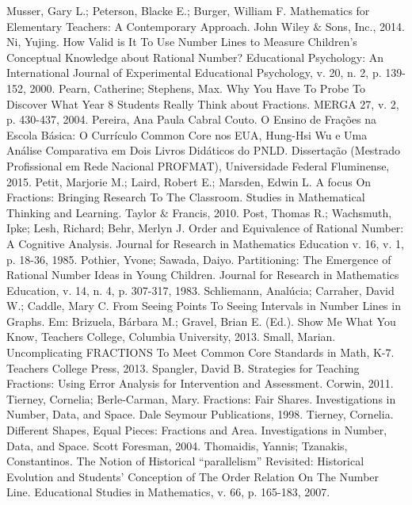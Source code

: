 \begin{thebibliography}{9}
     Musser, Gary L.; Peterson, Blacke E.; Burger, William F. Mathematics for Elementary Teachers: A Contemporary Approach. John Wiley $\&$ Sons, Inc., 2014.
     Ni, Yujing. How Valid is It To Use Number Lines to Measure Children's Conceptual Knowledge about Rational Number? Educational Psychology: An International Journal of Experimental Educational Psychology, v. 20, n. 2, p. 139-152, 2000.
     Pearn, Catherine; Stephens, Max. Why You Have To Probe To Discover What Year 8 Students Really Think about Fractions. MERGA 27, v. 2, p. 430-437, 2004.
     Pereira, Ana Paula Cabral Couto. O Ensino de Frações na Escola Básica: O Currículo Common Core nos EUA, Hung-Hsi Wu e Uma Análise Comparativa em Dois Livros Didáticos do PNLD. Dissertação (Mestrado Profissional em Rede Nacional PROFMAT), Universidade Federal Fluminense, 2015.
     Petit, Marjorie M.; Laird, Robert E.; Marsden, Edwin L. A focus On Fractions: Bringing Research To The Classroom. Studies in Mathematical Thinking and Learning. Taylor $\&$ Francis, 2010.
    Post, Thomas R.; Wachsmuth, Ipke; Lesh, Richard; Behr, Merlyn J. Order and Equivalence of Rational Number: A Cognitive Analysis. Journal for Research in Mathematics Education v. 16, v. 1, p. 18-36, 1985.
    Pothier, Yvone; Sawada, Daiyo. Partitioning: The Emergence of Rational Number Ideas in Young Children. Journal for Research in Mathematics Education, v. 14, n. 4, p. 307-317, 1983.
     Schliemann, Analúcia; Carraher, David W.; Caddle, Mary C. From Seeing Points To Seeing Intervals in Number Lines in Graphs. Em: Brizuela, Bárbara M.; Gravel, Brian E. (Ed.). Show Me What You Know, Teachers College, Columbia University, 2013.
    Small, Marian. Uncomplicating FRACTIONS To Meet Common Core Standards in Math, K-7. Teachers College Press, 2013.
    Spangler, David B. Strategies for Teaching Fractions: Using Error Analysis for Intervention and Assessment. Corwin, 2011.
     Tierney, Cornelia; Berle-Carman, Mary. Fractions: Fair Shares. Investigations in Number, Data, and Space. Dale Seymour Publications, 1998.
     Tierney, Cornelia. Different Shapes, Equal Pieces: Fractions and Area. Investigations in Number, Data, and Space. Scott Foresman, 2004.
     Thomaidis, Yannis; Tzanakis, Constantinos. The Notion of Historical “parallelism” Revisited: Historical Evolution and Students' Conception of The Order Relation On The Number Line. Educational Studies in Mathematics, v. 66, p. 165-183, 2007.

\end{thebibliography}
